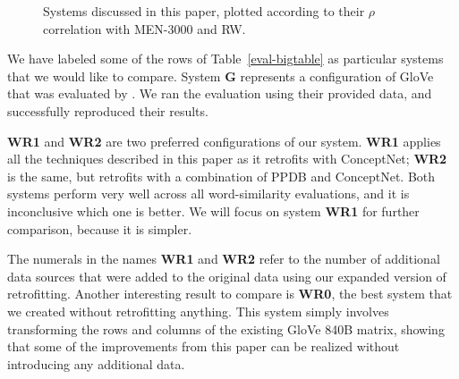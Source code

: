 \documentclass[11pt,letterpaper]{article}
\begin{document}
\begin{figure}
\caption{
    Systems discussed in this paper, plotted according to their $\rho$
    correlation with MEN-3000 and RW.
}
\label{compare-graph}
\end{figure}

We have labeled some of the rows of Table~\ref{eval-bigtable} as particular systems
that we would like to compare. System {\bf G} represents a configuration of
GloVe that was evaluated by . We ran the evaluation
using their provided data, and successfully reproduced their results.

{\bf WR1} and {\bf WR2} are two preferred configurations of our system. {\bf WR1}
applies all the techniques described in this paper as it retrofits with
ConceptNet; {\bf WR2} is the same, but retrofits with a combination of PPDB and
ConceptNet. Both systems perform very well across all word-similarity
evaluations, and it is inconclusive which one is better. We will focus on
system {\bf WR1} for further comparison, because it is simpler.

The numerals in the names {\bf WR1} and {\bf WR2} refer to the number of
additional data sources that were added to the original data using our expanded
version of retrofitting. Another interesting result to compare is {\bf WR0},
the best system that we created without retrofitting anything. This system
simply involves transforming the rows and columns of the existing GloVe 840B
matrix, showing that some of the improvements from this paper can be realized
without introducing any additional data.
\end{document}
